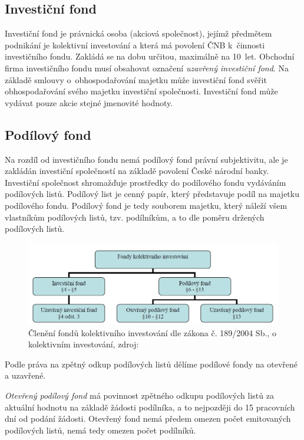 \documentclass[12pt,a4paper]{article}
\begin{document}
\subsection{Investiční fond}
Investiční fond je právnická osoba (akciová společnost), jejímž předmětem podnikání je kolektivní investování a která má povolení ČNB k~činnosti investičního fondu. Zakládá se na dobu určitou, maximálně na 10~let. Obchodní firma investičního fondu musí obsahovat označení \emph{uzavřený investiční fond}. Na základě smlouvy o~obhospodařování majetku může investiční fond svěřit obhospodařování svého majetku investiční společnosti. Investiční fond může vydávat pouze akcie stejné jmenovité hodnoty.

\subsection{Podílový fond}
Na rozdíl od investičního fondu nemá podílový fond právní subjektivitu, ale je zakládán investiční společností na základě povolení České národní banky. Investiční společnost shromažďuje prostředky do podílového fondu vydáváním podílových listů. Podílový list je cenný papír, který představuje podíl na majetku podílového fondu. Podílový fond je tedy souborem majetku, který náleží všem vlastníkům podílových listů, tzv. podílníkům, a to dle poměru držených podílových listů.  

\begin{figure}[htb]
\centering
\includegraphics[width=\textwidth]{deleni.png}
\caption{Členění fondů kolektivního investování dle zákona č. 189/2004 Sb., o kolektivním investování, zdroj: \cite{dp}}
\end{figure}

Podle práva na zpětný odkup podílových listů dělíme podílové fondy na otevřené a uzavřené.

\emph{Otevřený podílový fond} má povinnost zpětného odkupu podílových listů za aktuální hodnotu na základě žádosti podílníka, a to nejpozději do 15 pracovních dní od podání žádosti. Otevřený fond nemá předem omezen počet emitovaných podílových listů, nemá tedy omezen počet podílníků.
\end{document}
